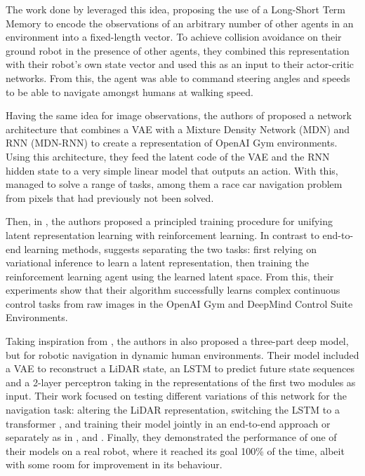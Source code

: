 The work done by \cite{MotionPlanningAmongDynamicAgentsDRL2018} leveraged this idea, proposing the use of a Long-Short Term Memory to encode the observations of an arbitrary number of other agents in an environment into a fixed-length vector. To achieve collision avoidance on their ground robot in the presence of other agents, they combined this representation with their robot's own state vector and used this as an input to their actor-critic networks. From this, the agent was able to command steering angles and speeds to be able to navigate amongst humans at walking speed.

Having the same idea for image observations, the authors of \cite{worldModels2018} proposed a network architecture that combines a VAE with a Mixture Density Network (MDN) and RNN (MDN-RNN) to create a representation of OpenAI Gym \cite{openAIgym} environments. Using this architecture, they feed the latent code of the VAE and the RNN hidden state to a very simple linear model that outputs an action. With this, \cite{worldModels2018} managed to solve a range of tasks, among them a race car navigation problem from pixels that had previously not been solved.

Then, in \cite{stochastic_latent_actor_critic}, the authors proposed a principled training procedure for unifying latent representation learning with reinforcement learning. In contrast to end-to-end learning methods, \cite{stochastic_latent_actor_critic} suggests separating the two tasks: first relying on variational inference to learn a latent representation, then training the reinforcement learning agent using the learned latent space. From this, their experiments show that their algorithm successfully learns complex continuous control tasks from raw images in the OpenAI Gym and DeepMind Control Suite Environments.

Taking inspiration from \cite{worldModels2018}, the authors in \cite{NavRep_unsupervised} also proposed a three-part deep model, but for robotic navigation in dynamic human environments. Their model included a VAE to reconstruct a LiDAR state, an LSTM to predict future state sequences and a 2-layer perceptron taking in the representations of the first two modules as input. Their work focused on testing different variations of this network for the navigation task: altering the LiDAR representation, switching the LSTM to a transformer \cite{transformer}, and training their model jointly in an end-to-end approach or separately as in \cite{worldModels2018}, and \cite{stochastic_latent_actor_critic}. Finally, they demonstrated the performance of one of their models on a real robot, where it reached its goal 100\% of the time, albeit with some room for improvement in its behaviour.

